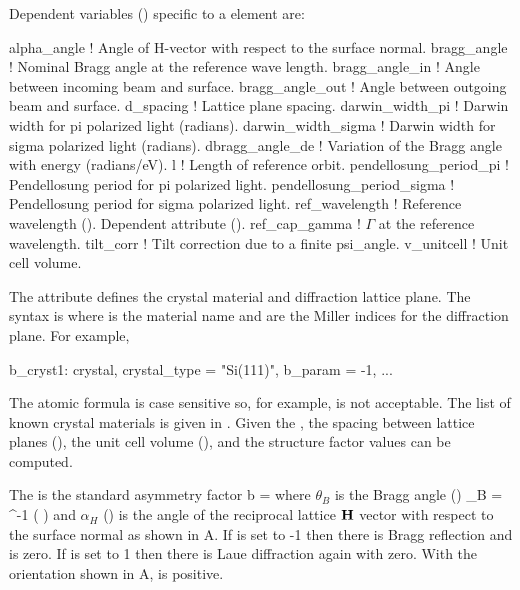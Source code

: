 Dependent variables () specific to a  element are:
\begin{example}
  alpha_angle                ! Angle of H-vector with respect to the surface normal.
  bragg_angle                ! Nominal Bragg angle at the reference wave length. 
  bragg_angle_in             ! Angle between incoming beam and surface.
  bragg_angle_out            ! Angle between outgoing beam and surface.
  d_spacing                  ! Lattice plane spacing. 
  darwin_width_pi            ! Darwin width for pi polarized light (radians).
  darwin_width_sigma         ! Darwin width for sigma polarized light (radians).
  dbragg_angle_de            ! Variation of the Bragg angle with energy (radians/eV).
  l                          ! Length of reference orbit.
  pendellosung_period_pi     ! Pendellosung period for pi polarized light.
  pendellosung_period_sigma  ! Pendellosung period for sigma polarized light.
  ref_wavelength             ! Reference wavelength (). Dependent attribute ().
  ref_cap_gamma              ! \(\Gamma\) at the reference wavelength.
  tilt_corr                  ! Tilt correction due to a finite psi_angle.
  v_unitcell                 ! Unit cell volume. 
\end{example}

The  attribute defines the crystal material and
diffraction lattice plane. The syntax is  where 
is the material name and  are the Miller
indices for the diffraction plane. For example,
\begin{example}
  b_cryst1: crystal, crystal_type = "Si(111)", b_param = -1, ...
\end{example}
The atomic formula is case sensitive so, for example, 
is not acceptable. The list of known crystal materials is given in
. Given the , the spacing between
lattice planes (), the unit cell volume
(), and the structure factor\cite{b:batterman} values
can be computed.

The  is the standard asymmetry factor
\Begineq
  b =  
  \label{batat}
\Endeq
where $\theta_B$ is the Bragg angle () 
\Begineq
  \theta_B = \sin^{-1} \left(  \right)
  \label{tsl2d}
\Endeq
and $\alpha_H$ () is the angle of the reciprocal
lattice ${\bf H}$ vector with respect to the surface normal as shown in
A.  If  is set to -1 then there is
Bragg reflection and  is zero. If  is set to 1
then there is Laue diffraction again with  zero. With the
orientation shown in A,  is positive.

